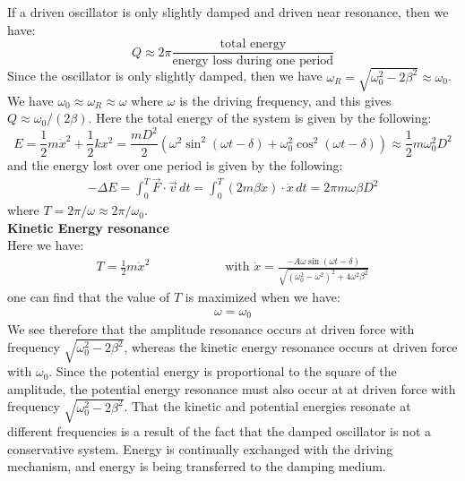 \documentclass[11pt,oneside]{book}
\theoremstyle{break}
\theoremstyle{break}
\begin{document}
If a driven oscillator is only slightly damped and driven near resonance, then we have:
$$Q \approx 2\pi \frac{\text{total energy}}{\text{energy loss during one period}}$$
Since the oscillator is only slightly damped, then we have $\omega_R = \sqrt{\omega_0^2 - 2\beta^2} \approx \omega_0$. We have $\omega_0 \approx \omega_R \approx \omega$ where $\omega$ is the driving frequency, and this gives $Q \approx \omega_0 /(2\beta)$. Here the total energy of the system is given by the following:
$$E = \frac{1}{2}m\dot{x}^2 + \frac{1}{2}kx^2 = \frac{mD^2}{2}\left( \omega^2 \sin^2 (\omega t- \delta ) + \omega_0^2 \cos^2 (\omega t-\delta) \right) \approx \frac{1}{2}m \omega_0^2 D^2$$
and the energy lost over one period is given by the following:
\begin{align*}
-\Delta E = \int_0^T \vec{F}\cdot \vec{v}\, dt = \int_0^T (2m\beta \dot{x}) \cdot \dot{x}\, dt = 2\pi m \omega \beta D^2 
\end{align*}
where $T = 2\pi /\omega \approx 2\pi /\omega_0$.\\


\textbf{Kinetic Energy resonance}\\
Here we have:
\begin{align*}
 T = \frac{1}{2}m\dot{x}^2 \qquad\qquad\qquad\text{with }\dot{x} = \frac{-A\omega \sin(\omega t-\delta)}{\sqrt{(\omega_0^2 -\omega^2)^2 +4\omega^2 \beta^2}}
\end{align*}
one can find that the value of $T$ is maximized when we have:
\begin{align*}
\omega = \omega_0
\end{align*}
We see therefore that the amplitude resonance occurs at driven force with frequency $\sqrt{\omega_0^2 -2\beta^2}$, whereas the kinetic energy resonance occurs at driven force with $\omega_0$. Since the potential energy is proportional to the square of the amplitude, the potential energy resonance must also occur at at driven force with frequency $\sqrt{\omega_0^2 -2\beta^2}$. That the kinetic and potential energies resonate at different frequencies is a result of the fact that the damped oscillator is not a conservative system. Energy is continually exchanged with the driving mechanism, and energy is being transferred to the damping medium. 
\end{document}
